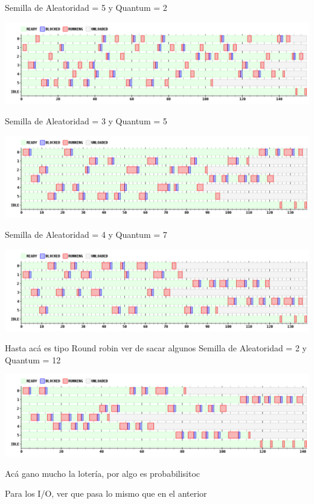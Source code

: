 Semilla de Aleatoridad = 5 y Quantum = 2
\begin {center}
\includegraphics[width=16cm]{../simusched/outputs/ej8/sl-ej8-5-2.png}
\end {center}
Semilla de Aleatoridad = 3 y Quantum = 5
\begin {center}
\includegraphics[width=16cm]{../simusched/outputs/ej8/sl-ej8-3-5.png}
\end {center}
Semilla de Aleatoridad = 4 y Quantum = 7
\begin {center}
\includegraphics[width=16cm]{../simusched/outputs/ej8/sl-ej8-4-7.png}
\end {center}
Hasta acá es tipo Round robin ver de sacar algunos
Semilla de Aleatoridad = 2 y Quantum = 12
\begin {center}
\includegraphics[width=16cm]{../simusched/outputs/ej8/sl-ej8-2-12.png}
\end {center}
Acá gano mucho la lotería, por algo es probabilisitoc

Para los I/O, ver que pasa lo mismo que en el anterior

